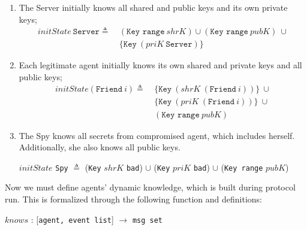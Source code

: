 \begin{enumerate}
  \item The Server initially knows all shared and public keys and its own private keys;
  \begin{equation*}
    \begin{split}
      initState\ \texttt{Server} \triangleq\
      & (\texttt{Key range}\ shrK) \cup (\texttt{Key range}\ pubK)\ \cup \\
      & \{\texttt{Key}\ (priK\ \texttt{Server})\}
    \end{split}
  \end{equation*}
  \item Each legitimate agent initially knows its own shared and private keys and all public keys;
  \begin{equation*}
    \begin{split}
      initState (\texttt{Friend}\ \textit{i}) \triangleq\
      & \{ \texttt{Key}\ (shrK\ (\texttt{Friend}\ i))\}\ \cup \\
      & \{ \texttt{Key}\ (priK\ (\texttt{Friend}\ i))\}\ \cup \\
      & (\texttt{Key range}\ pubK)
    \end{split}
  \end{equation*}
  \item The Spy knows all secrets from compromised agent, which includes herself. Additionally, she also knows all public keys.
  \begin{center}
    $initState$ \texttt{Spy} $\triangleq$ (\texttt{Key} $shrK$ \texttt{bad}) $\cup$ (\texttt{Key} $priK$ \texttt{bad}) $\cup$ (\texttt{Key range} $pubK$)
  \end{center}
\end{enumerate}

Now we must define agents' dynamic knowledge, which is built during protocol run. This is formalized through the following function and definitions:

\begin{center}
  $knows$ : [\texttt{agent, event list}] $\longrightarrow$ \texttt{msg set}
\end{center}

